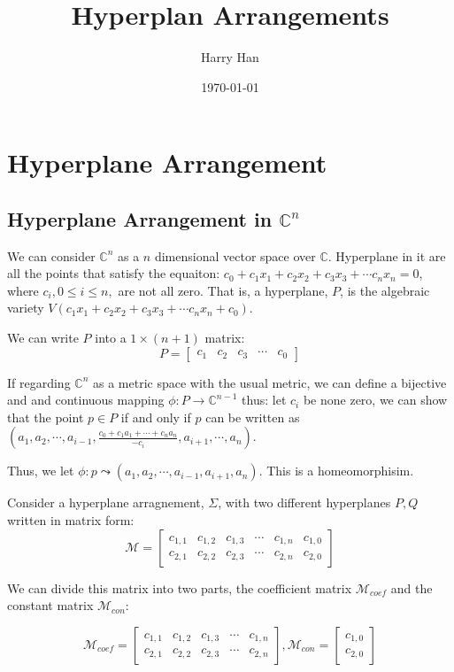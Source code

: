 \documentclass[12pt, a4paper]{article}
\title{Hyperplan Arrangements}
\author{Harry Han}
\date{\today}
\theoremstyle{definition}
\theoremstyle{remark}
\newcommand{\bb}[1]{\mathbb{#1}}
\newcommand{\curly}{\mathrel{\leadsto}}
\begin{document}
\maketitle
\section{Hyperplane Arrangement}

\subsection{Hyperplane Arrangement in $\bb{C}^n$}

We can consider $\bb{C}^n$ as a $n$ dimensional vector space over $\bb{C}$. 
Hyperplane in it are all the points that satisfy the equaiton: $c_0 + c_1x_1 + c_2x_2 + c_3x_3 + \cdots c_nx_n = 0$, where $c_i, 0 \leq i \leq n, $ are not all zero.
That is, a hyperplane, $P$, is the algebraic variety $V(c_1x_1 + c_2x_2 + c_3x_3 + \cdots c_nx_n + c_0)$. 

We can write $P$ into a $1\times (n+1)$ matrix: 
$$
P = 
\begin{bmatrix}
	c_1 & c_2 & c_3 & \cdots & c_0
\end{bmatrix}
$$

If regarding $\mathbb{C}^n$ as a metric space with the usual metric, 
we can define a bijective and and continuous  mapping $\phi: P \rightarrow  \bb{C}^{n-1}$ thus:
let $c_i$ be none zero, we can show that the point $p \in P$ if and only if $p$ can be written as 
\\
$(a_1, a_2, \cdots, a_{i-1}, \frac{c_0 + c_1a_1 + \cdots + c_na_n}{-c_i}, a_{i+1}, \cdots, a_n)$.

Thus, we let  
$\phi: p \curly (a_1, a_2, \cdots, a_{i-1}, a_{i+1}, a_n)$.
This is a homeomorphisim. 

Consider a hyperplane arragnement, $\Sigma$, with two different hyperplanes $P, Q$ written in matrix form:
$$
\mathcal{M} = 
\begin{bmatrix}
	c_{1,1} & c_{1,2} & c_{1,3} & \cdots & c_{1,n} & c_{1,0} \\
	c_{2,1} & c_{2,2} & c_{2,3} & \cdots & c_{2,n} & c_{2,0}
\end{bmatrix}
$$

We can divide this matrix into two parts, the coefficient matrix $\mathcal{M}_{coef}$ and the constant matrix $\mathcal{M}_{con}$:

$$
\mathcal{M}_{coef} =
\begin{bmatrix}
	c_{1,1} & c_{1,2} & c_{1,3} & \cdots & c_{1,n} \\
	c_{2,1} & c_{2,2} & c_{2,3} & \cdots & c_{2,n}
\end{bmatrix}
,
\mathcal{M}_{con} =
\begin{bmatrix}
	c_{1,0} \\
	c_{2,0}
\end{bmatrix}
$$
\end{document}
